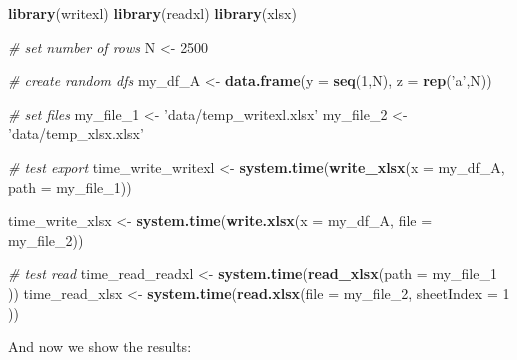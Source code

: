 \documentclass[
  12pt,
]{book}
\newenvironment{Shaded}{\begin{snugshade}}{\end{snugshade}}
\newcommand{\CommentTok}[1]{\textcolor[rgb]{0.37,0.37,0.37}{\textit{#1}}}
\newcommand{\DataTypeTok}[1]{\textcolor[rgb]{0.27,0.27,0.27}{#1}}
\newcommand{\DecValTok}[1]{\textcolor[rgb]{0.06,0.06,0.06}{#1}}
\newcommand{\KeywordTok}[1]{\textcolor[rgb]{0.27,0.27,0.27}{\textbf{#1}}}
\newcommand{\NormalTok}[1]{#1}
\newcommand{\StringTok}[1]{\textcolor[rgb]{0.5,0.5,0.5}{#1}}
\begin{document}
\begin{Shaded}
\begin{Highlighting}[]
\KeywordTok{library}\NormalTok{(writexl)}
\KeywordTok{library}\NormalTok{(readxl)}
\KeywordTok{library}\NormalTok{(xlsx)}

\CommentTok{# set number of rows}
\NormalTok{N <-}\StringTok{ }\DecValTok{2500}

\CommentTok{# create random dfs}
\NormalTok{my_df_A <-}\StringTok{ }\KeywordTok{data.frame}\NormalTok{(}\DataTypeTok{y =} \KeywordTok{seq}\NormalTok{(}\DecValTok{1}\NormalTok{,N),}
                      \DataTypeTok{z =} \KeywordTok{rep}\NormalTok{(}\StringTok{'a'}\NormalTok{,N))}

\CommentTok{# set files}
\NormalTok{my_file_}\DecValTok{1}\NormalTok{ <-}\StringTok{ 'data/temp_writexl.xlsx'}
\NormalTok{my_file_}\DecValTok{2}\NormalTok{ <-}\StringTok{ 'data/temp_xlsx.xlsx'}

\CommentTok{# test export}
\NormalTok{time_write_writexl <-}\StringTok{ }\KeywordTok{system.time}\NormalTok{(}\KeywordTok{write_xlsx}\NormalTok{(}\DataTypeTok{x =}\NormalTok{ my_df_A,}
                                             \DataTypeTok{path =}\NormalTok{ my_file_}\DecValTok{1}\NormalTok{))}

\NormalTok{time_write_xlsx <-}\StringTok{ }\KeywordTok{system.time}\NormalTok{(}\KeywordTok{write.xlsx}\NormalTok{(}\DataTypeTok{x =}\NormalTok{ my_df_A,}
                                          \DataTypeTok{file =}\NormalTok{ my_file_}\DecValTok{2}\NormalTok{))}

\CommentTok{# test read}
\NormalTok{time_read_readxl <-}\StringTok{ }\KeywordTok{system.time}\NormalTok{(}\KeywordTok{read_xlsx}\NormalTok{(}\DataTypeTok{path =}\NormalTok{ my_file_}\DecValTok{1}\NormalTok{ ))}
\NormalTok{time_read_xlsx <-}\StringTok{ }\KeywordTok{system.time}\NormalTok{(}\KeywordTok{read.xlsx}\NormalTok{(}\DataTypeTok{file =}\NormalTok{ my_file_}\DecValTok{2}\NormalTok{,}
                                        \DataTypeTok{sheetIndex =} \DecValTok{1}\NormalTok{ ))}
\end{Highlighting}
\end{Shaded}

And now we show the results:
\end{document}
